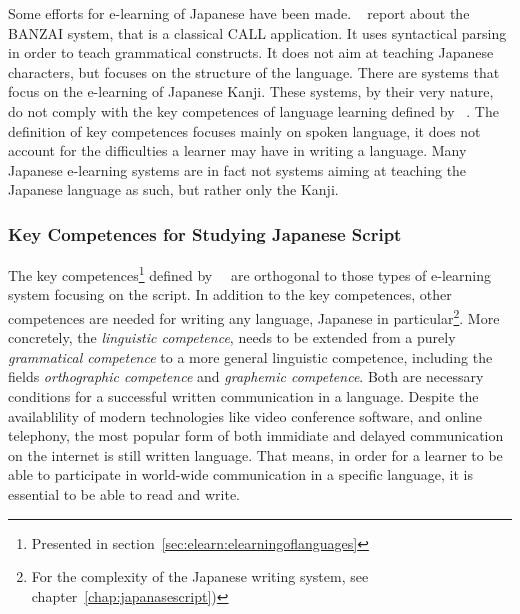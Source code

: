 Some efforts for e-learning of Japanese have been made.
~\citeyear{Nagata2002} report about the BANZAI system,
that is a classical CALL application. It uses syntactical parsing in order
to teach grammatical constructs. It does not aim at teaching Japanese
characters, but focuses on the structure of the language.
There are systems that focus on the e-learning of Japanese Kanji. 
These systems, by their very nature, do not comply with the key competences
of language learning defined by ~\citeyear{Richert2007}. The definition of
key competences focuses mainly on spoken language, it does not account for
the difficulties a learner may have in writing a language.
Many Japanese e-learning systems are in fact not systems aiming at teaching
the Japanese language as such, but rather only the Kanji.

\subsubsection{Key Competences for Studying Japanese Script}
\label{sec:elearn:keycompetencesforstudyingjapanesescript}

The key 
competences\footnote{Presented in 
section~\ref{sec:elearn:elearningoflanguages}} 
defined by~~\citeyear{Richert2007} are orthogonal to 
those types of e-learning system focusing on the script. 
In addition to the key competences, other competences are needed for writing any 
language, Japanese in 
particular\footnote{For the complexity of the Japanese writing system, 
see chapter~\ref{chap:japanasescript})}. 
More concretely, the \emph{linguistic competence}, needs to be extended
from a purely \emph{grammatical competence} to a more general linguistic 
competence, including the fields \emph{orthographic competence} 
and \emph{graphemic competence}. Both are necessary conditions for a successful 
written communication in a language. 
Despite the availablility of modern technologies like video conference software,
and online telephony, the most popular form of both immidiate and delayed 
communication on the internet is still written language. 
That means, in order for a learner to be able to participate in world-wide 
communication in a specific language, it is essential to be able to read and 
write.



